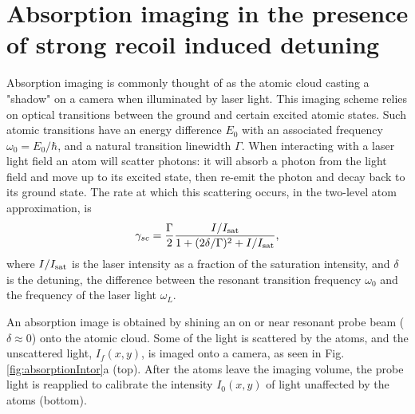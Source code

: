 \documentclass[12pt]{iopart}
\begin{document}
\section{Absorption imaging in the presence of strong recoil induced detuning}
Absorption imaging is commonly thought of as the atomic cloud casting a "shadow" on a camera when illuminated by laser light. This imaging scheme relies on optical transitions between the ground and certain excited atomic states. Such atomic transitions have an energy difference $E_0$ with an associated frequency $\omega_0 = E_0/\hbar$, and a natural transition linewidth $\Gamma$. When interacting with a laser light field an atom will scatter photons: it will absorb a photon from the light field and move up to its excited state,  then re-emit the photon and decay back to its ground state. The  rate at which this scattering occurs, in the two-level atom approximation, is \cite{LCT}
\begin{equation}
\gamma_{sc}= \frac{\Gamma}{2} \frac{I/I_{\rm{sat}}}{1+(2\delta/\Gamma)^2 +I/I_{\rm{sat}}}, 
\label{eq:scatrate}
\end{equation}
where $I/I_{\rm{sat}}$ is the laser intensity as a fraction of the saturation intensity, and $\delta$ is the detuning, the difference between the resonant transition frequency $\omega_0$ and the frequency of the laser light $\omega_L$.  
\par An absorption image is obtained by shining an on or near resonant probe beam ($\delta\approx0$) onto the atomic cloud. Some of the light is scattered by the atoms, and the unscattered light, $I_f(x,y)$, is imaged onto a camera, as seen in Fig. \ref{fig:absorptionIntor}a (top). After the atoms leave the imaging volume, the probe light is reapplied to calibrate the intensity $I_0(x,y)$ of light unaffected by the atoms (bottom). 
\end{document}
